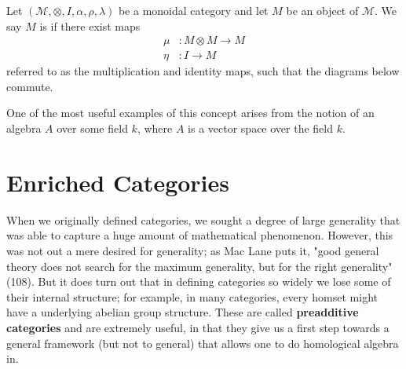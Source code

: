 \begin{definition}
    Let $(\mathcal{M}, \otimes, I, \alpha, \rho, \lambda)$ 
    be a monoidal category and let $M$ be an object of $\mathcal{M}$.
    We say $M$ is if there exist maps 
    \begin{align*}
        \mu&: M\otimes M \to M \\
        \eta&: I \to M
    \end{align*}
    referred to as the multiplication and identity maps, such that the diagrams below 
    commute. 
    \begin{center}

    \end{center}
\end{definition}

\begin{example}
    One of the most useful examples of this concept arises from the notion of 
    an algebra $A$ over some field $k$, where $A$ is a vector space over the field 
    $k$. 
\end{example}

\newpage
\section{Enriched Categories}

When we originally defined categories, we sought a degree of large generality 
that was able to capture a huge amount of mathematical phenomenon. However, this 
was not out a mere desired for generality; as Mac Lane puts it, "good general theory
does not search for the maximum generality, but for the right generality" (108). 
But it does turn out that in defining categories so widely we lose some of their internal 
structure; for example, in many categories, every homset might have a underlying 
abelian group structure. These are called \textbf{preadditive categories} and are extremely 
useful, in that they give us a first step towards a general framework (but not to general) 
that allows one to do homological algebra in. 

